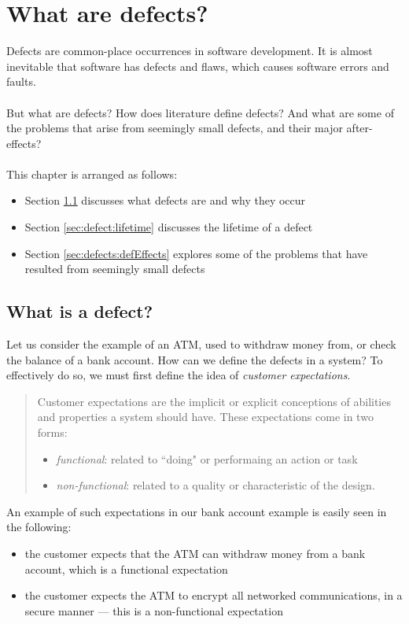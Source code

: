 \chapter{What are defects?} \label{chapter:defects}
Defects are common-place occurrences in software development.
It is almost inevitable that software has defects and flaws, which causes software errors and
faults.\\
\\
But what are defects?
How does literature define defects?
And what are some of the problems that arise from seemingly small defects,
and their major after-effects?\\
\\
This chapter is arranged as follows:
\begin{itemize}
	\item Section \ref{sec:defects:defect} discusses what defects are and why they occur
	\item Section \ref{sec:defect:lifetime} discusses the lifetime of a defect
	\item Section \ref{sec:defects:defEffects} explores some of the problems
  that have resulted from seemingly small defects
\end{itemize}

\section{What is a defect?} \label{sec:defects:defect}

Let us consider the example of an ATM, used to withdraw money from, or check the balance of a bank
account.
How can we define the defects in a system?
To effectively do so, we must first define the idea of {\em customer expectations}.
\begin{quote}
	Customer expectations are the implicit or explicit conceptions of abilities and properties a
	system should have.
	These expectations come in two forms:
	\begin{itemize}
		\item {\em functional}: related to ``doing" or performaing an action or task
		\item {\em non-functional}: related to a quality or characteristic of the design.
	\end{itemize}
\end{quote}

An example of such expectations in our bank account example is easily seen in the following:
\begin{itemize}
	\item the customer expects that the ATM can withdraw money from a bank account, which is a
		functional expectation
	\item the customer expects the ATM to encrypt all networked communications, in a secure manner ---
		this is a non-functional expectation
\end{itemize}

